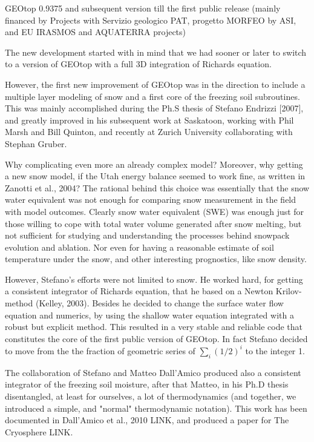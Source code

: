 GEOtop 0.9375 and subsequent version till the first public release
(mainly financed by Projects with Servizio geologico PAT, progetto MORFEO by ASI, and EU IRASMOS and  AQUATERRA projects)

The new development started with in mind that we had sooner or later to switch to a version of GEOtop with a full 3D integration of Richards equation. 

However, the first new improvement of GEOtop was in the direction to include a multiple layer  modeling of snow and a first core of the freezing soil subroutines.  This was mainly accomplished during the Ph.S thesis of Stefano Endrizzi [2007], and greatly improved in his subsequent work at Saskatoon, working with Phil Marsh and Bill Quinton, and recently at Zurich University collaborating with  Stephan Gruber. 

Why complicating even more an already complex model? Moreover, why getting a new snow model, if the Utah energy balance seemed to work fine, as written in Zanotti et al., 2004?
The rational behind this choice was essentially that the snow water equivalent was not enough for comparing snow measurement in the field with model outcomes. Clearly snow water equivalent (SWE) was enough just for those willing to cope with total water volume generated after snow melting, but not sufficient for studying and understanding the processes behind snowpack evolution and ablation. Nor even for having a reasonable estimate of soil temperature under the snow, and other interesting prognostics, like snow density. 

However, Stefano's efforts were not limited to snow. He worked hard, for getting a consistent integrator of Richards equation, that he based on a Newton Krilov-method (Kelley, 2003).  Besides he decided to change the surface water flow  equation and numerics, by using the shallow water equation integrated with a robust but explicit method.  This resulted in a very stable and reliable code that constitutes the core of the first public version of GEOtop. In fact Stefano decided to move from the the fraction of geometric series of  $\sum_i (1/2)^i$ to the integer 1.

The collaboration of Stefano and Matteo Dall'Amico produced also a consistent integrator of the freezing soil moisture, after that Matteo, in his Ph.D thesis disentangled, at least for ourselves,  a lot of thermodynamics (and together, we introduced a simple, and "normal" thermodynamic notation). This work has been documented in Dall'Amico et al., 2010 LINK, and produced a paper for The Cryosphere LINK. 

